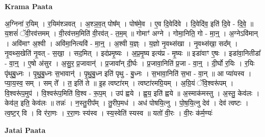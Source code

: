 \documentclass[17pt]{extarticle}
\begin{document}
\textbf{Krama Paata} \newline

अ॒ग्निना॑ र॒यिम् । र॒यिम॑श्ञवत् । अ॒श्ञ॒व॒त् पोष᳚म् । पोष॑मे॒व । ए॒व दि॒वेदि॑वे । दि॒वेदि॑व॒ इति॑ दि॒वे - दि॒वे॒ ॥ य॒शसं॑ ॅवी॒रव॑त्तमम् । वी॒रव॑त्तम॒मिति॑ वी॒रव॑त् - त॒म॒म् ॥ गोमाꣳ॑ अग्ने । गोमा॒निति॒ गो - मा॒न्॒ । अ॒ग्नेऽवि॑मान् । अवि॑माꣳ अ॒श्वी । अवि॑मा॒नित्यवि॑ - मा॒न्॒ । अ॒श्वी य॒ज्ञ्ः । य॒ज्ञो नृ॒वथ्स॑खा । नृ॒वथ्स॑खा॒ सद᳚म् । नृ॒वथ्स॒खेति॑ नृ॒वत् - स॒खा॒ । सद॒मित् । इद॑प्रमृ॒ष्यः । अ॒प्र॒मृ॒ष्य इत्य॑प्र - मृ॒ष्यः ॥ इडा॑वाꣳ ए॒षः । इडा॑वा॒नितीडा᳚ - वा॒न्॒ । ए॒षो अ॑सुर । अ॒सु॒र॒ प्र॒जावान्॑ । प्र॒जावा᳚न् दी॒र्घः । प्र॒जावा॒निति॑ प्र॒जा - वा॒न्॒ । दी॒र्घो र॒यिः । र॒यिः पृ॑थुबु॒ध्नः । पृ॒थु॒बु॒ध्नः स॒भावान्॑ । पृ॒थु॒बु॒ध्न इति॑ पृथु - बु॒ध्नः । स॒भावा॒निति॑ स॒भा - वा॒न् ॥ आ प्या॑यस्व । प्या॒य॒स्व॒ सम् । सम् ते᳚ । त॒ इति॑ ते ॥ इ॒ह त्वष्टा॑रम् । त्वष्टा॑रमग्रि॒यम् । अ॒ग्रि॒यं ॅवि॒श्वरू॑पम् । वि॒श्वरू॑प॒मुप॑ । वि॒श्वरू॑प॒मिति॑ वि॒श्व - रू॒प॒म् । उप॑ ह्वये । ह्व॒य॒ इति॑ ह्वये ॥ अ॒स्माक॑मस्तु । अ॒स्तु॒ केव॑लः । केव॑ल॒ इति॒ केव॑लः ॥ तन्नः॑ । न॒स्तु॒रीप᳚म् । तु॒रीप॒मध॑ । अध॑ पोषयि॒त्नु । पो॒ष॒यि॒त्नु देव॑ । देव॑ त्वष्टः । त्व॒ष्ट॒र् वि । वि र॑रा॒णः । र॒रा॒णः स्य॑स्व । स्य॒स्वेति॑ स्यस्व ॥ यतो॑ वी॒रः । वी॒रः क॑र्म॒ण्यः॑ \newline

\textbf{Jatai Paata} \newline
\end{document}
